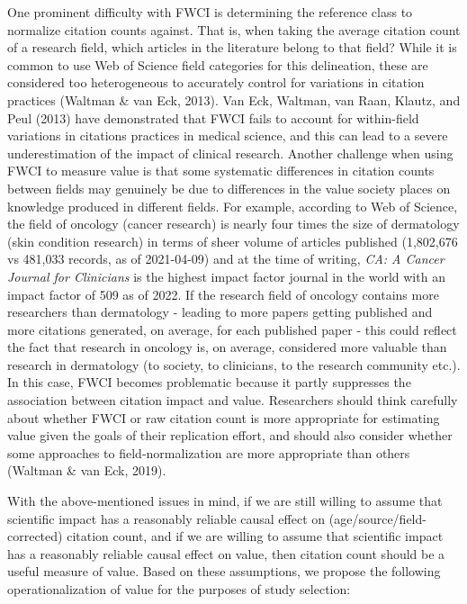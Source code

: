 \documentclass[
  english,
  jou,floatsintext]{apa6}
\begin{document}
One prominent difficulty with FWCI is determining the reference class to normalize citation counts against. That is, when taking the average citation count of a research field, which articles in the literature belong to that field? While it is common to use Web of Science field categories for this delineation, these are considered too heterogeneous to accurately control for variations in citation practices (Waltman \& van Eck, 2013). Van Eck, Waltman, van Raan, Klautz, and Peul (2013) have demonstrated that FWCI fails to account for within-field variations in citations practices in medical science, and this can lead to a severe underestimation of the impact of clinical research. Another challenge when using FWCI to measure value is that some systematic differences in citation counts between fields may genuinely be due to differences in the value society places on knowledge produced in different fields. For example, according to Web of Science, the field of oncology (cancer research) is nearly four times the size of dermatology (skin condition research) in terms of sheer volume of articles published (1,802,676 vs 481,033 records, as of 2021-04-09) and at the time of writing, \emph{CA: A Cancer Journal for Clinicians} is the highest impact factor journal in the world with an impact factor of 509 as of 2022. If the research field of oncology contains more researchers than dermatology - leading to more papers getting published and more citations generated, on average, for each published paper - this could reflect the fact that research in oncology is, on average, considered more valuable than research in dermatology (to society, to clinicians, to the research community etc.). In this case, FWCI becomes problematic because it partly suppresses the association between citation impact and value. Researchers should think carefully about whether FWCI or raw citation count is more appropriate for estimating value given the goals of their replication effort, and should also consider whether some approaches to field-normalization are more appropriate than others (Waltman \& van Eck, 2019).

With the above-mentioned issues in mind, if we are still willing to assume that scientific impact has a reasonably reliable causal effect on (age/source/field-corrected) citation count, and if we are willing to assume that scientific impact has a reasonably reliable causal effect on value, then citation count should be a useful measure of value. Based on these assumptions, we propose the following operationalization of value for the purposes of study selection:
\end{document}
